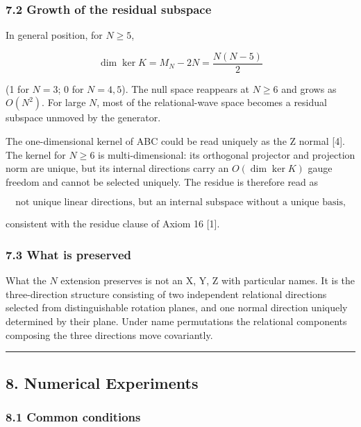 \documentclass[
  a4paper,
]{article}
\begin{document}
\subsubsection{7.2 Growth of the residual
subspace}\label{growth-of-the-residual-subspace}

In general position, for \(N\ge5\),

\[
\dim\ker K
=
M_N-2N
=
\frac{N(N-5)}{2}
\]

(1 for \(N=3\); 0 for \(N=4,5\)). The null space reappears at \(N\ge6\)
and grows as \(O(N^2)\). For large \(N\), most of the relational-wave
space becomes a residual subspace unmoved by the generator.

The one-dimensional kernel of ABC could be read uniquely as the Z normal
{[}4{]}. The kernel for \(N\ge6\) is multi-dimensional: its orthogonal
projector and projection norm are unique, but its internal directions
carry an \(O(\dim\ker K)\) gauge freedom and cannot be selected
uniquely. The residue is therefore read as

\[
\boxed{
\text{not unique linear directions, but an internal subspace without a unique basis,}
}
\]

consistent with the residue clause of Axiom 16 {[}1{]}.

\subsubsection{7.3 What is preserved}\label{what-is-preserved}

What the \(N\) extension preserves is not an X, Y, Z with particular
names. It is the three-direction structure consisting of two independent
relational directions selected from distinguishable rotation planes, and
one normal direction uniquely determined by their plane. Under name
permutations the relational components composing the three directions
move covariantly.

\begin{center}\rule{0.5\linewidth}{0.5pt}\end{center}

\subsection{8. Numerical Experiments}\label{numerical-experiments}

\subsubsection{8.1 Common conditions}\label{common-conditions}
\end{document}
